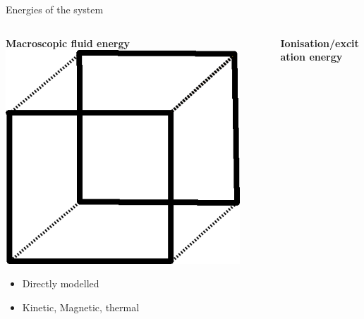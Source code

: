 \documentclass[10pt,aspectratio=169,usenames,dvipsnames]{beamer}
\begin{document}


\begin{frame}{Energies of the system}
\begin{columns}
\begin{column}{0.3\textwidth}
\centering
\textbf{Macroscopic fluid energy}
\includegraphics[width=0.9\textwidth]{2023ECRW/Figures/fluidelement.png}
\begin{itemize}
    \item Directly modelled
    \item Kinetic, Magnetic, thermal
\end{itemize}
\end{column}
\begin{column}{0.3\textwidth}
\centering
\textbf{Ionisation/excitation energy}

\end{column}
\end{columns}
\end{frame}
\end{document}
